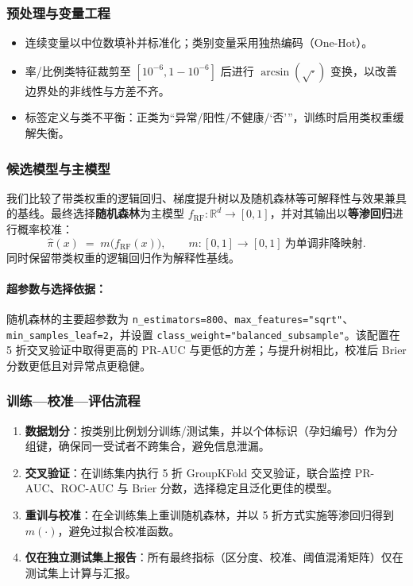 \documentclass[12pt,a4paper]{ctexart}
\numberwithin{equation}{section}
\theoremstyle{mcm}
\begin{document}
\subsubsection{预处理与变量工程}
\begin{itemize}\itemsep0.2em
  \item 连续变量以中位数填补并标准化；类别变量采用独热编码（One-Hot）。
  \item 率/比例类特征裁剪至 $[10^{-6},1-10^{-6}]$ 后进行 $\arcsin(\sqrt{\cdot})$ 变换，以改善边界处的非线性与方差不齐。
  \item 标签定义与类不平衡：正类为“异常/阳性/不健康/‘否’”，训练时启用类权重缓解失衡。
\end{itemize}

\subsubsection{候选模型与主模型}
我们比较了带类权重的逻辑回归、梯度提升树以及随机森林等可解释性与效果兼具的基线。最终选择\textbf{随机森林}为主模型 $f_{\mathrm{RF}}:\mathbb{R}^d\to[0,1]$，并对其输出以\textbf{等渗回归}进行概率校准：
\[
\hat{\pi}(x) \;=\; m\!\big(f_{\mathrm{RF}}(x)\big),\qquad 
m:[0,1]\to[0,1]\ \text{为单调非降映射}.
\]
同时保留带类权重的逻辑回归作为解释性基线。

\paragraph{超参数与选择依据：}
随机森林的主要超参数为 \texttt{n\_estimators=800}、\texttt{max\_features="sqrt"}、\texttt{min\_samples\_leaf=2}，并设置 \texttt{class\_weight="balanced\_subsample"}。该配置在 5 折交叉验证中取得更高的 PR-AUC 与更低的方差；与提升树相比，校准后 Brier 分数更低且对异常点更稳健。

\subsubsection{训练—校准—评估流程}
\begin{enumerate}\itemsep0.2em
  \item \textbf{数据划分}：按类别比例划分训练/测试集，并以个体标识（孕妇编号）作为分组键，确保同一受试者不跨集合，避免信息泄漏。
  \item \textbf{交叉验证}：在训练集内执行 5 折 GroupKFold 交叉验证，联合监控 PR-AUC、ROC-AUC 与 Brier 分数，选择稳定且泛化更佳的模型。
  \item \textbf{重训与校准}：在全训练集上重训随机森林，并以 5 折方式实施等渗回归得到 $m(\cdot)$，避免过拟合校准函数。
  \item \textbf{仅在独立测试集上报告}：所有最终指标（区分度、校准、阈值混淆矩阵）仅在测试集上计算与汇报。
\end{enumerate}
\end{document}
